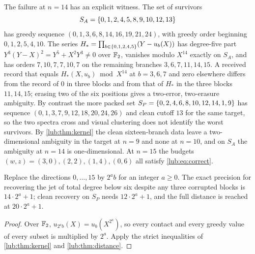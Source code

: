 The failure at $n=14$ has an explicit witness. The set of survivors
\[
 S_A=\{0,1,2,4,5,8,9,10,12,13\}
\]
has greedy sequence
$(0,1,3,6,8,14,16,19,21,24)$, with greedy order beginning $0,1,2,5,4,10$. The series
$H_*=\prod_{b\in\{0,1,2,4,5\}}(Y-u_b(X))$ has degree-five part
$Y^3(Y-X)^2=Y^5+X^2Y^3\ne0$ over $\mathbb{F}_2$, vanishes modulo $X^{14}$ exactly on $S_A$, and has
orders $7,10,7,7,10,7$ on the remaining branches $3,6,7,11,14,15$. A received record that
equals $H_*(X,u_b)\bmod X^{14}$ at $b=3,6,7$ and zero elsewhere differs from the record of
$0$ in three blocks and from that of $H_*$ in the three blocks $11,14,15$; erasing two of the
six positions gives a two-error, two-erasure ambiguity. By contrast the more packed set
$S_P=\{0,2,4,6,8,10,12,14,1,9\}$ has sequence $(0,1,3,7,9,12,18,20,24,26)$ and clean
cutoff $13$ for the same target, so the two spectra cross and visual clustering does not
identify the worst survivors. By \cref{lub:thm:kernel} the clean sixteen-branch data leave a
two-dimensional ambiguity in the target at $n=9$ and none at $n=10$, and on $S_A$ the
ambiguity at $n=14$ is one-dimensional. At $n=15$ the budgets $(w,z)=(3,0),(2,2),(1,4),(0,6)$
all satisfy \eqref{lub:eq:correct}.

\begin{corollary}\label{lub:cor:scaled}
Replace the directions $0,\dots,15$ by $2^ab$ for an integer $a\ge0$. The exact precision
for recovering the jet of total degree below six despite any three corrupted blocks is
$14\cdot2^a+1$; clean recovery on $S_P$ needs $12\cdot2^a+1$, and the full distance is
reached at $20\cdot2^a+1$.
\end{corollary}

\begin{proof}
Over $\mathbb{F}_2$, $u_{2^ab}(X)=u_b(X^{2^a})$, so every contact and every greedy value of every
subset is multiplied by $2^a$. Apply the strict inequalities of \cref{lub:thm:kernel} and
\cref{lub:thm:distance}.
\end{proof}

